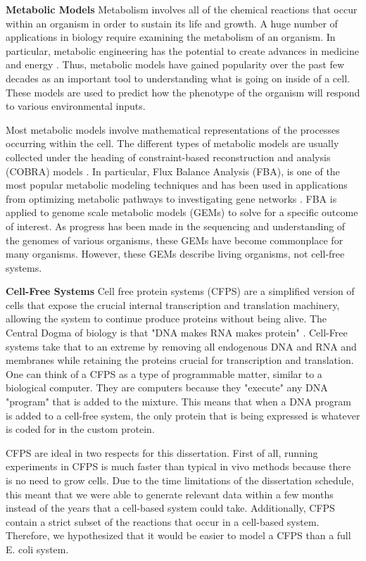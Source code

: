 \textbf{Metabolic Models}
Metabolism involves all of the chemical reactions that occur within an organism in order to sustain its life and growth.
A huge number of applications in biology require examining the metabolism of an organism.
In particular, metabolic engineering has the potential to create advances in medicine and energy \cite{keasling2012synthetic}.
Thus, metabolic models have gained popularity over the past few decades as an important tool to understanding what is going on inside of a cell.
These models are used to predict how the phenotype of the organism will respond to various environmental inputs.

Most metabolic models involve mathematical representations of the processes occurring within the cell.
The different types of metabolic models are usually collected under the heading of constraint-based reconstruction and analysis (COBRA) models \cite{schellenberger2011quantitative}.
In particular, Flux Balance Analysis (FBA), is one of the most popular metabolic modeling techniques and has been used in applications from optimizing metabolic pathways \cite{almaas2004global} to investigating gene networks \cite{shlomi2007genome}.
FBA is applied to genome scale metabolic models (GEMs) to solve for a specific outcome of interest.
As progress has been made in the sequencing and understanding of the genomes of various organisms, these GEMs have become commonplace for many organisms.
However, these GEMs describe living organisms, not cell-free systems.

\textbf{Cell-Free Systems}
Cell free protein systems (CFPS) are a simplified version of cells that expose the crucial internal transcription and translation machinery, allowing the system to continue produce proteins without being alive.
The Central Dogma of biology is that "DNA makes RNA makes protein" \cite{}.
Cell-Free systems take that to an extreme by removing all endogenous DNA and RNA and membranes while retaining the proteins crucial for transcription and translation.
One can think of a CFPS as a type of programmable matter, similar to a biological computer.
They are computers because they "execute" any DNA "program" that is added to the mixture.
This means that when a DNA program is added to a cell-free system, the only protein that is being expressed is whatever is coded for in the custom protein.

CFPS are ideal in two respects for this dissertation.
First of all, running experiments in CFPS is much faster than typical in vivo methods because there is no need to grow cells.
Due to the time limitations of the dissertation schedule, this meant that we were able to generate relevant data within a few months instead of the years that a cell-based system could take.
Additionally, CFPS contain a strict subset of the reactions that occur in a cell-based system.
Therefore, we hypothesized that it would be easier to model a CFPS than a full E. coli system.

